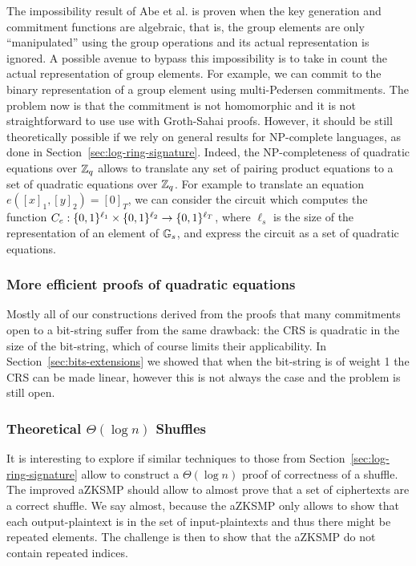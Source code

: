 The impossibility result of Abe et al. is proven when the key generation and commitment functions are {algebraic}, that is, the group elements are only ``manipulated'' using the group operations and its actual representation is ignored.
A possible avenue to bypass this impossibility is to take in count the actual representation of group elements. For example, we can commit to the binary representation of a group element using multi-Pedersen commitments. The problem now is that the commitment is not homomorphic and it is not straightforward to use use with Groth-Sahai proofs. However, it should be still theoretically possible if we rely on general results for NP-complete languages, as done in Section~\ref{sec:log-ring-signature}.
Indeed, the NP-completeness of quadratic equations over $\mathbb{Z}_q$ allows to translate any set of pairing product equations to a set of quadratic equations over $\mathbb{Z}_q$. For example to translate an equation $e([x]_1,[y]_2)=[0]_T$, we can consider the circuit which computes the function $C_e:\{0,1\}^{\ell_1}\times \{0,1\}^{\ell_2} \to\{0,1\}^{\ell_T}$, where $\ell_s$ is the size of the representation of an element of $\mathbb{G}_s$, and express the circuit as a set of quadratic equations.

\subsubsection{More efficient proofs of quadratic equations}
Mostly all of our constructions derived from the proofs that many commitments open to a bit-string suffer from the same drawback: the CRS is quadratic in the size of the bit-string, which of course limits their applicability. In Section~\ref{sec:bits-extensions} we showed that when the bit-string is of weight 1 the CRS can be made linear, however this is not always the case and the problem is still open.
 
\subsubsection{Theoretical $\Theta(\log n)$ Shuffles}
It is interesting to explore if similar techniques to those from Section~\ref{sec:log-ring-signature} allow to construct a $\Theta(\log n)$ proof of correctness of a shuffle. The improved aZKSMP should allow to almost prove that a set of ciphertexts are a correct shuffle. We say almost, because the aZKSMP only allows to show that each output-plaintext is in the set of input-plaintexts and thus there might be repeated elements. The challenge is then to show that the aZKSMP do not contain repeated indices.

